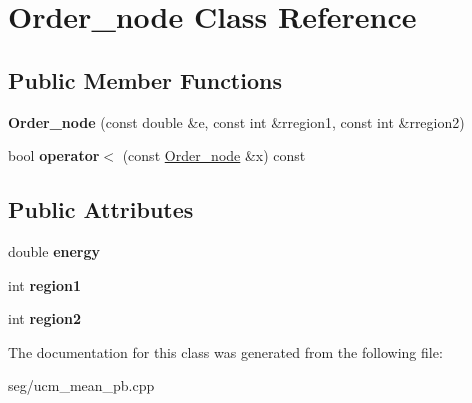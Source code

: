 \hypertarget{class_order__node}{\section{Order\-\_\-node Class Reference}
\label{class_order__node}
}
\subsection*{Public Member Functions}
\begin{DoxyCompactItemize}
\item 
\hypertarget{class_order__node_a70fb9ce7d7d9de77fe26779a4d6f72de}{{\bfseries Order\-\_\-node} (const double \&e, const int \&rregion1, const int \&rregion2)}\label{class_order__node_a70fb9ce7d7d9de77fe26779a4d6f72de}

\item 
\hypertarget{class_order__node_aaad15c1d97118392489b078c9af95819}{bool {\bfseries operator$<$} (const \hyperlink{class_order__node}{Order\-\_\-node} \&x) const }\label{class_order__node_aaad15c1d97118392489b078c9af95819}

\end{DoxyCompactItemize}
\subsection*{Public Attributes}
\begin{DoxyCompactItemize}
\item 
\hypertarget{class_order__node_a016fea4d6ada7d1e1a24eee281504429}{double {\bfseries energy}}\label{class_order__node_a016fea4d6ada7d1e1a24eee281504429}

\item 
\hypertarget{class_order__node_a8db01e0369ae72e902b32f549088e6ab}{int {\bfseries region1}}\label{class_order__node_a8db01e0369ae72e902b32f549088e6ab}

\item 
\hypertarget{class_order__node_a421bec7db1e1305778636dbe0262e9bd}{int {\bfseries region2}}\label{class_order__node_a421bec7db1e1305778636dbe0262e9bd}

\end{DoxyCompactItemize}


The documentation for this class was generated from the following file\-:\begin{DoxyCompactItemize}
\item 
seg/ucm\-\_\-mean\-\_\-pb.\-cpp\end{DoxyCompactItemize}
